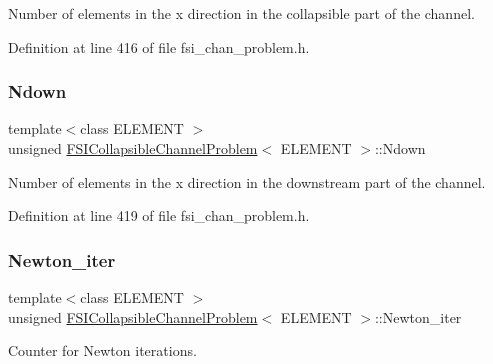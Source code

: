 Number of elements in the x direction in the collapsible part of the channel. 



Definition at line 416 of file fsi\+\_\+chan\+\_\+problem.\+h.

\mbox{\label{classFSICollapsibleChannelProblem_a64c0aa974b39527ef22e352a4f22b156}} 
\subsubsection{\texorpdfstring{Ndown}{Ndown}}
{\footnotesize\ttfamily template$<$class E\+L\+E\+M\+E\+NT $>$ \\
unsigned \hyperlink{classFSICollapsibleChannelProblem}{F\+S\+I\+Collapsible\+Channel\+Problem}$<$ E\+L\+E\+M\+E\+NT $>$\+::Ndown\hspace{0.3cm}{\ttfamily [protected]}}



Number of elements in the x direction in the downstream part of the channel. 



Definition at line 419 of file fsi\+\_\+chan\+\_\+problem.\+h.

\mbox{\label{classFSICollapsibleChannelProblem_a72b19fe66f2c9019ee2da6987a09995c}} 
\subsubsection{\texorpdfstring{Newton\+\_\+iter}{Newton\_iter}}
{\footnotesize\ttfamily template$<$class E\+L\+E\+M\+E\+NT $>$ \\
unsigned \hyperlink{classFSICollapsibleChannelProblem}{F\+S\+I\+Collapsible\+Channel\+Problem}$<$ E\+L\+E\+M\+E\+NT $>$\+::Newton\+\_\+iter\hspace{0.3cm}{\ttfamily [protected]}}



Counter for Newton iterations. 



